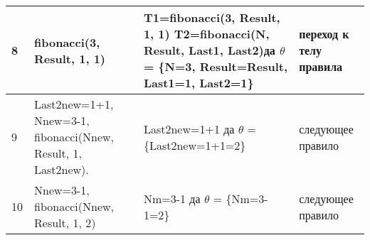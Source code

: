 \begin{table}[h]
\begin{center}
\begin{threeparttable}
\begin{tabular}{|m{0.5cm}|m{3.5cm}|m{8.5cm}|m{3cm}|}
				\hline
				8 & fibonacci(3, Result, 1, 1) & T1=fibonacci(3, Result, 1, 1) \newline T2=fibonacci(N, Result, Last1, Last2)\newline да \newline $\theta$ = \{N=3, Result=Result, Last1=1, Last2=1\} & переход к \newline телу правила \\
				\hline
				9 & Last2new=1+1, \newline Nnew=3-1, \newline fibonacci(Nnew, Result, 1, Last2new). & Last2new=1+1 \newline да \newline $\theta$ = \{Last2new=1+1=2\} & следующее правило \\
				\hline
				10 & Nnew=3-1, \newline fibonacci(Nnew, Result, 1, 2) & Nm=3-1 \newline да \newline $\theta$ = \{Nm=3-1=2\} & следующее правило \\
				\hline
			\end{tabular}
\end{threeparttable}
\end{center}
\end{table}
	

